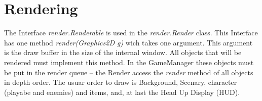 	\section{Rendering}
	The Interface \emph{render.Renderable} is used in the \emph{render.Render} class. This Interface  has one method \emph{render(Graphics2D g)} wich takes one argument. This argument is the draw buffer in the size of the internal window. All objects that will be rendered must implement this method. In the GameManager these objects must be put in the render queue -- the Render access the \emph{render} method of all objects in depth order. The usuar order to draw is  Background, Scenary, character (playabe and enemies) and items, and, at last the Head Up Display (HUD).
	
	